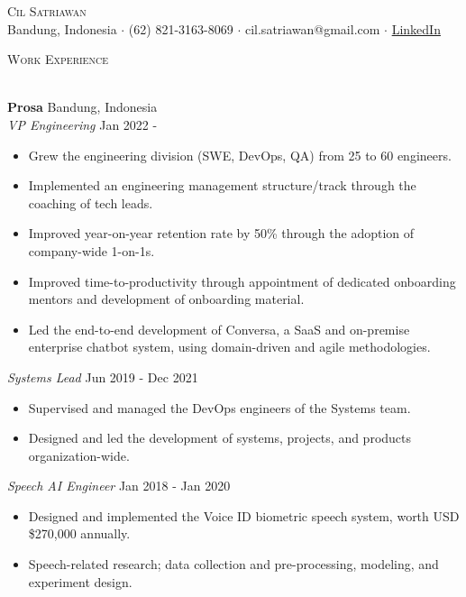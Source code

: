 \documentclass[a4paper]{article}
\newcommand{\lineunder} {
    \vspace*{-8pt} \\
    \hspace*{-18pt} \hrulefill \\
}
\newcommand{\header} [1] {
    {\hspace*{-18pt}\vspace*{6pt} \textsc{#1}}
    \vspace*{-6pt} \lineunder
}
\begin{document}
\vspace*{-40pt}

    

\vspace*{-30pt}
\begin{center}
	{\Huge \scshape {Cil Satriawan}}\\
	Bandung, Indonesia $\cdot$ (62) 821-3163-8069 $\cdot$ cil.satriawan@gmail.com 
        $\cdot$ \href{https://www.linkedin.com/in/cil-satriawan-a60601111}{LinkedIn}\\
\end{center}

\header{Work Experience}
\vspace{1mm}

\textbf{Prosa} \hfill Bandung, Indonesia\\
\textit{VP Engineering} \hfill Jan 2022 -\\
\vspace{-3mm}
\begin{itemize} \itemsep -2pt
  \item Grew the engineering division (SWE, DevOps, QA) from 25 to 60 engineers.
  \item Implemented an engineering management structure/track through the
    coaching of tech leads.
  \item Improved year-on-year retention rate by 50\% through the adoption of
    company-wide 1-on-1s.
  \item Improved time-to-productivity through appointment of dedicated
    onboarding mentors and development of onboarding material.
  \item Led the end-to-end development of Conversa, a SaaS and on-premise
    enterprise chatbot system, using domain-driven and agile methodologies.
\end{itemize}
\vspace{-3mm}
\textit{Systems Lead} \hfill Jun 2019 - Dec 2021\\
\vspace{-3mm}
\begin{itemize} \itemsep -2pt
  \item Supervised and managed the DevOps engineers of the Systems team.
  \item Designed and led the development of systems, projects, and products
    organization-wide.
\end{itemize}
\vspace{-3mm}
\textit{Speech AI Engineer} \hfill Jan 2018 - Jan 2020\\
\vspace{-3mm}
\begin{itemize} \itemsep -2pt
  \item Designed and implemented the Voice ID biometric speech system, worth USD
    \$270,000 annually.
  \item Speech-related research; data collection and pre-processing, modeling,
    and experiment design.
\end{itemize}
\end{document}
